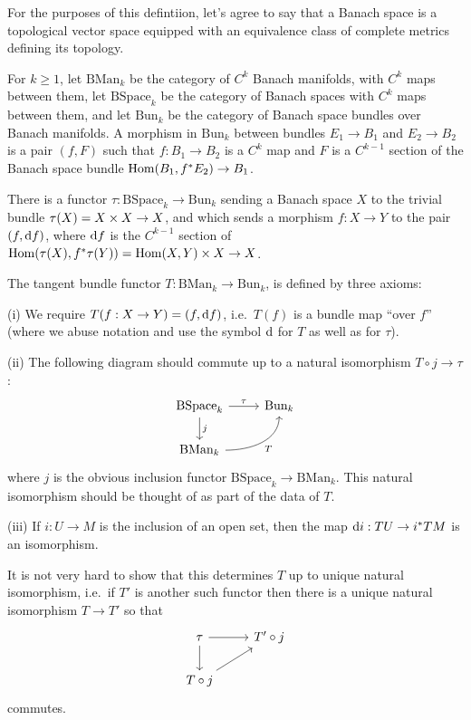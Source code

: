 \begin{defn}
  For the purposes of this defintiion, let's agree to say that a Banach space is a topological vector space equipped with an equivalence class of complete metrics defining its topology.
  
  For $k\ge 1$, let $\text{BMan}_{k}$ be the category of $C^{k}$ Banach manifolds, with $C^{k}$ maps between them, let $\text{BSpace}_{k}$ be the category of Banach spaces with $C^{k}$ maps between them, and let $\text{Bun}_{k}$ be the category of Banach space bundles over Banach manifolds. A morphism in $\text{Bun}_{k}$ between bundles $E_{1}\to B_{1}$ and $E_{2}\to B_{2}$ is a pair $(f,F)$ such that $f:B_{1}\to B_{2}$ is a $C^{k}$ map and $F$ is a $C^{k-1}$ section of the Banach space bundle $\operatorname{\mathrm{Hom}}(B_{1},f^{*}E_{2})\to B_{1}$.

  There is a functor $\tau:\text{BSpace}_{k}\to \text{Bun}_{k}$ sending a Banach space $X$ to the trivial bundle $\tau(X)=X\times X\to X$, and which sends a morphism $f:X\to Y$ to the pair $(f,\mathrm{d} f)$, where $\mathrm{d} f$ is the $C^{k-1}$ section of $\operatorname{\mathrm{Hom}}(\tau(X),f^{*}\tau(Y))=\operatorname{\mathrm{Hom}}(X,Y)\times X\to X$.

  The tangent bundle functor $T:\text{BMan}_{k}\to \text{Bun}_{k}$, is defined by three axioms:

  (i) We require $T(f:X\to Y)=(f,\mathrm{d} f)$, i.e.\ $T(f)$ is a bundle map ``over $f$'' (where we abuse notation and use the symbol $\mathrm{d}$ for $T$ as well as for $\tau$). 

  (ii) The following diagram should commute up to a natural isomorphism $T\circ j\to \tau$:
  \begin{equation*}
    \begin{tikzcd}
      \text{BSpace}_{k}\arrow[r,"\tau"]\arrow[d,"j"]&\text{Bun}_{k}\\
      \text{BMan}_{k}\arrow[ru,"T",swap,out=0,in=-90]&
    \end{tikzcd}
  \end{equation*}
  where $j$ is the obvious inclusion functor $\text{BSpace}_{k}\to \text{BMan}_{k}$. This natural isomorphism should be thought of as part of the data of $T$.

  (iii) If $i:U\to M$ is the inclusion of an open set, then the map $\mathrm{d} i:TU\to i^{*}TM$ is an isomorphism.

  It is not very hard to show that this determines $T$ up to unique natural isomorphism, i.e.\ if $T'$ is another such functor then there is a unique natural isomorphism $T\to T'$ so that
  \begin{equation*}
    \begin{tikzcd}
      \tau\arrow[r]\arrow[d]&T'\circ j\\
      T\circ j\arrow[ru]
    \end{tikzcd}
  \end{equation*}
  commutes.
\end{defn}

